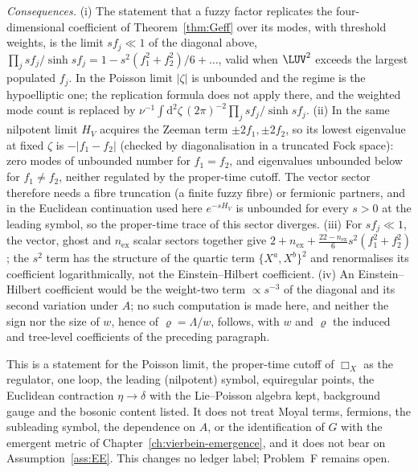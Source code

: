 \emph{Consequences.} (i) The statement that a fuzzy factor replicates the four-dimensional coefficient of Theorem~\ref{thm:Geff} over its modes, with threshold weights, is the limit \(sf_j\ll1\) of the diagonal above, \(\prod_j sf_j/\sinh sf_j=1-s^2(f_1^2+f_2^2)/6+\dots\), valid when \(\LUV^2\) exceeds the largest populated \(f_j\). In the Poisson limit \(|\zeta|\) is unbounded and the regime is the hypoelliptic one; the replication formula does not apply there, and the weighted mode count is replaced by \(\nu^{-1}\int\mathrm d^2\zeta\,(2\pi)^{-2}\prod_j sf_j/\sinh sf_j\). (ii) In the same nilpotent limit \(H_V\) acquires the Zeeman term \(\pm2f_1,\pm2f_2\), so its lowest eigenvalue at fixed \(\zeta\) is \(-|f_1-f_2|\) (checked by diagonalisation in a truncated Fock space): zero modes of unbounded number for \(f_1=f_2\), and eigenvalues unbounded below for \(f_1\ne f_2\), neither regulated by the proper-time cutoff. The vector sector therefore needs a fibre truncation (a finite fuzzy fibre) or fermionic partners, and in the Euclidean continuation used here \(e^{-sH_V}\) is unbounded for every \(s>0\) at the leading symbol, so the proper-time trace of this sector diverges. (iii) For \(sf_j\ll1\), the vector, ghost and \(n_{\mathrm{ex}}\) scalar sectors together give \(2+n_{\mathrm{ex}}+\tfrac{22-n_{\mathrm{ex}}}{6}s^2(f_1^2+f_2^2)\); the \(s^2\) term has the structure of the quartic term \(\{X^a,X^b\}^2\) and renormalises its coefficient logarithmically, not the Einstein--Hilbert coefficient. (iv) An Einstein--Hilbert coefficient would be the weight-two term \(\propto s^{-3}\) of the diagonal and its second variation under \(A\); no such computation is made here, and neither the sign nor the size of \(w\), hence of \(\varrho=\Lambda/w\), follows, with \(w\) and \(\varrho\) the induced and tree-level coefficients of the preceding paragraph.

This is a statement for the Poisson limit, the proper-time cutoff of \(\Box_X\) as the regulator, one loop, the leading (nilpotent) symbol, equiregular points, the Euclidean contraction \(\eta\to\delta\) with the Lie--Poisson algebra kept, background gauge and the bosonic content listed. It does not treat Moyal terms, fermions, the subleading symbol, the dependence on \(A\), or the identification of \(G\) with the emergent metric of Chapter~\ref{ch:vierbein-emergence}, and it does not bear on Assumption~\ref{ass:EE}. This changes no ledger label; Problem~F remains open.

